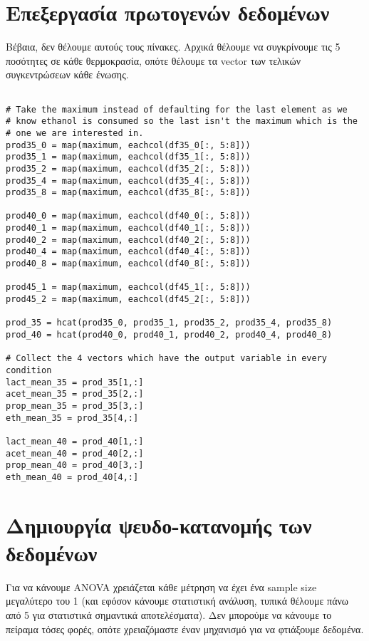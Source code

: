\documentclass[11pt]{article}
\begin{document}
\section{Επεξεργασία πρωτογενών δεδομένων}
\label{sec:orgef20ac5}
Βέβαια, δεν θέλουμε αυτούς τους πίνακες. Αρχικά θέλουμε να συγκρίνουμε τις 5 ποσότητες σε κάθε θερμοκρασία, οπότε θέλουμε τα vector των τελικών συγκεντρώσεων κάθε ένωσης.

\begin{verbatim}

# Take the maximum instead of defaulting for the last element as we
# know ethanol is consumed so the last isn't the maximum which is the
# one we are interested in.
prod35_0 = map(maximum, eachcol(df35_0[:, 5:8]))
prod35_1 = map(maximum, eachcol(df35_1[:, 5:8]))
prod35_2 = map(maximum, eachcol(df35_2[:, 5:8]))
prod35_4 = map(maximum, eachcol(df35_4[:, 5:8]))
prod35_8 = map(maximum, eachcol(df35_8[:, 5:8]))

prod40_0 = map(maximum, eachcol(df40_0[:, 5:8]))
prod40_1 = map(maximum, eachcol(df40_1[:, 5:8]))
prod40_2 = map(maximum, eachcol(df40_2[:, 5:8]))
prod40_4 = map(maximum, eachcol(df40_4[:, 5:8]))
prod40_8 = map(maximum, eachcol(df40_8[:, 5:8]))

prod45_1 = map(maximum, eachcol(df45_1[:, 5:8]))
prod45_2 = map(maximum, eachcol(df45_2[:, 5:8]))

prod_35 = hcat(prod35_0, prod35_1, prod35_2, prod35_4, prod35_8)
prod_40 = hcat(prod40_0, prod40_1, prod40_2, prod40_4, prod40_8)

# Collect the 4 vectors which have the output variable in every condition
lact_mean_35 = prod_35[1,:]
acet_mean_35 = prod_35[2,:]
prop_mean_35 = prod_35[3,:]
eth_mean_35 = prod_35[4,:]

lact_mean_40 = prod_40[1,:]
acet_mean_40 = prod_40[2,:]
prop_mean_40 = prod_40[3,:]
eth_mean_40 = prod_40[4,:]

\end{verbatim}

\section{Δημιουργία ψευδο-κατανομής των δεδομένων}
\label{sec:orgd46f57f}
Για να κάνουμε ANOVA χρειάζεται κάθε μέτρηση να έχει ένα sample size μεγαλύτερο του 1 (και εφόσον κάνουμε στατιστική ανάλυση, τυπικά θέλουμε πάνω από 5 για στατιστικά σημαντικά αποτελέσματα). Δεν μπορούμε να κάνουμε το πείραμα τόσες φορές, οπότε χρειαζόμαστε έναν μηχανισμό για να φτιάξουμε δεδομένα.
\end{document}
